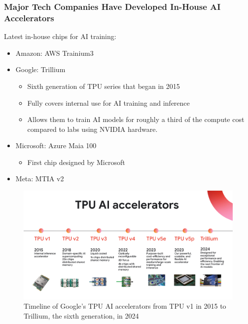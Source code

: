 \documentclass[aspectratio=169]{beamer}
\begin{document}
    \begin{frame}
        \frametitle{Major Tech Companies Have Developed In-House AI Accelerators}
        Latest in-house chips for AI training:
        \begin{itemize}
            \item Amazon: AWS Trainium3~\parencite{tweaktown_amazon_2024}
            \item Google: Trillium~\parencite{google_tpu_2024}
            \begin{itemize}
                \item Sixth generation of TPU series that began in 2015
                \item Fully covers internal use for AI training and inference
                \item Allows them to train AI models for roughly a third of the compute cost compared to labs using NVIDIA hardware.~\parencite{epoch_notable_ai_models_2025}
            \end{itemize}
            \item Microsoft: Azure Maia 100~\parencite{microsoft_azure_maia_2023}
            \begin{itemize}
                \item First chip designed by Microsoft
            \end{itemize}
            \item Meta: MTIA v2~\parencite{meta_mtia_2024}
        \end{itemize}
    \end{frame}
    \begin{frame}
        \begin{figure}
            \includegraphics[height=0.5\textwidth]{images/tpu-history}
            \caption{Timeline of Google's TPU AI accelerators from TPU v1 in 2015 to Trillium, the sixth generation, in 2024~\parencite{google_tpu_2024}}
        \end{figure}
    \end{frame}
\end{document}
